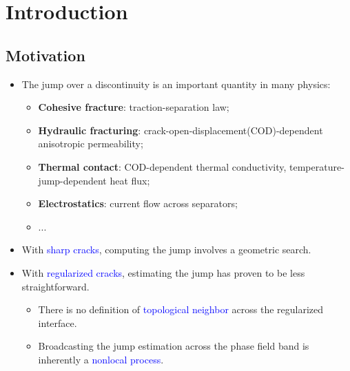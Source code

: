\section{Introduction}

\sectioncover

\subsection{Motivation}

\begin{frame}
    \begin{itemize}
        \setlength\itemsep{2pt}
        \item The jump over a discontinuity is an important quantity in many physics:
              \begin{itemize}
                  \setlength\itemsep{2pt}
                  \item \textbf{Cohesive fracture}: traction-separation law;
                  \item \textbf{Hydraulic fracturing}: crack-open-displacement(COD)-dependent anisotropic permeability;
                  \item \textbf{Thermal contact}: COD-dependent thermal conductivity, temperature-jump-dependent heat flux;
                  \item \textbf{Electrostatics}: current flow across separators;
                  \item ...
              \end{itemize}
        \item<2-> With \textcolor{blue}{sharp cracks}, computing the jump involves a geometric search.
        \item<3-> With \textcolor{blue}{regularized cracks}, estimating the jump has proven to be less straightforward.
            \begin{itemize}
                \setlength\itemsep{2pt}
                \item There is no definition of \textcolor{blue}{topological neighbor} across the regularized interface.
                \item<4-> Broadcasting the jump estimation across the phase field band is inherently a \textcolor{blue}{nonlocal process}.
            \end{itemize}
    \end{itemize}
    \hspace{20pt}
    \begin{tikzpicture}[scale=1.5,visible on=<2->]

\end{tikzpicture}
\end{frame}

